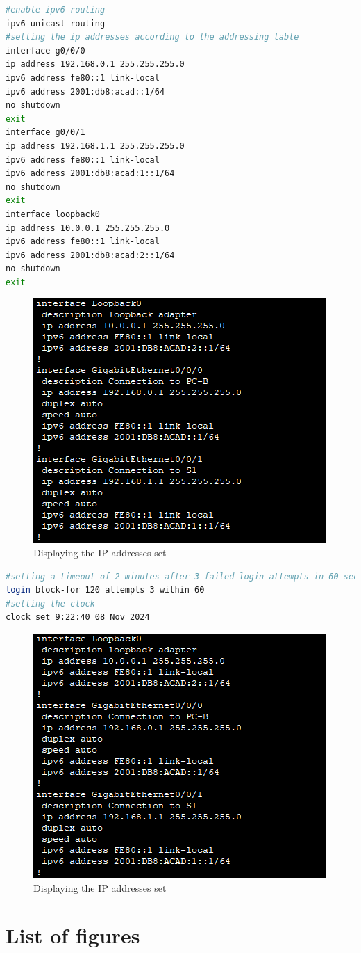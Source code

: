 \documentclass[a4paper]{article}
\newcommand{\abc}{\hfill \break}
\begin{document}
\begin{lstlisting}[language=bash,
	keywordstyle=\color{black},
	rulecolor=\color{blue}]
#enable ipv6 routing
ipv6 unicast-routing
#setting the ip addresses according to the addressing table
interface g0/0/0
ip address 192.168.0.1 255.255.255.0
ipv6 address fe80::1 link-local
ipv6 address 2001:db8:acad::1/64
no shutdown
exit
interface g0/0/1
ip address 192.168.1.1 255.255.255.0
ipv6 address fe80::1 link-local
ipv6 address 2001:db8:acad:1::1/64
no shutdown
exit
interface loopback0
ip address 10.0.0.1 255.255.255.0
ipv6 address fe80::1 link-local
ipv6 address 2001:db8:acad:2::1/64
no shutdown
exit
\end{lstlisting}
\begin{figure}[h]
	\includegraphics[scale=0.55]{images/showip.png}
	\centering
	\caption{Displaying the IP addresses set}
\end{figure}\abc
\begin{lstlisting}[language=bash,
	keywordstyle=\color{black},
	rulecolor=\color{blue}]
#setting a timeout of 2 minutes after 3 failed login attempts in 60 seconds
login block-for 120 attempts 3 within 60
#setting the clock
clock set 9:22:40 08 Nov 2024
\end{lstlisting}
\begin{figure}[h]
	\includegraphics[scale=0.55]{images/showip.png}
	\centering
	\caption{Displaying the IP addresses set}
\end{figure}\abc


\newpage
\section{List of figures}

\listoffigures
\end{document}
